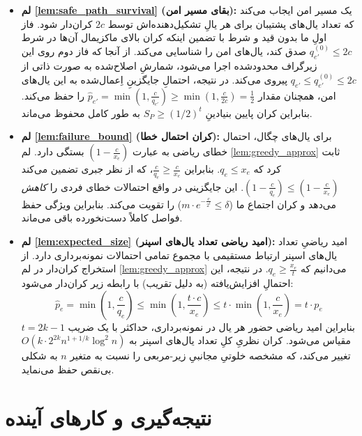 \documentclass[11pt,a4paper]{report}
\theoremstyle{plain}
\theoremstyle{definition}
\theoremstyle{remark}
\begin{document}
\begin{itemize}
    \item \textbf{لم \ref{lem:safe_path_survival} (بقای مسیر امن):} یک مسیر امن ایجاب می‌کند که تعداد یال‌های پشتیبان برای هر یالِ تشکیل‌دهنده‌اش توسط $2c$ کران‌دار شود. فاز اولِ ما بدون قید و شرط با تضمین اینکه کران بالای ماکزیمال آن‌ها در شرط $q_{e'}^{(0)} \le 2c$ صدق کند، یال‌های امن را شناسایی می‌کند. از آنجا که فاز دوم روی این زیرگراف محدودشده اجرا می‌شود، شمارشِ اصلاح‌شده به صورت ذاتی از $q_{e'} \le q_{e'}^{(0)} \le 2c$ پیروی می‌کند. در نتیجه، احتمالِ جایگزینِ اِعمال‌شده به این یال‌های امن، همچنان مقدار $\hat{p}_{e'} = \min\left(1, \frac{c}{q_{e'}}\right) \ge \min\left(1, \frac{c}{2c}\right) = \frac{1}{2}$ را حفظ می‌کند. بنابراین کران پایین بنیادینِ $S_P \ge (1/2)^t$ به طور کامل محفوظ می‌ماند.
    
    \item \textbf{لم \ref{lem:failure_bound} (کران احتمال خطا):} برای یال‌های چگال، احتمال خطای ریاضی به عبارت $(1 - \frac{c}{x_e})$ بستگی دارد. لم \ref{lem:greedy_approx} ثابت کرد که $q_e \le x_e$. بنابراین $\frac{c}{q_e} \ge \frac{c}{x_e}$، که از نظر جبری تضمین می‌کند $\left(1 - \frac{c}{q_e}\right) \le \left(1 - \frac{c}{x_e}\right)$. این جایگزینی در واقع احتمالات خطای فردی را \emph{کاهش} می‌دهد و کران اجتماع ما ($m \cdot e^{-\frac{c}{2^t}} \le \delta$) را تقویت می‌کند. بنابراین ویژگی حفظ فواصل کاملاً دست‌نخورده باقی می‌ماند.
    
    \item \textbf{لم \ref{lem:expected_size} (امید ریاضی تعداد یال‌های اسپنر):} امید ریاضیِ تعداد یال‌های اسپنر ارتباط مستقیمی با مجموع تمامی احتمالات نمونه‌برداری دارد. از استخراج کران‌دار در لم \ref{lem:greedy_approx} می‌دانیم که $q_e \ge \frac{x_e}{t}$. در نتیجه، این احتمالِ افزایش‌یافته (به دلیل تقریب) با رابطه زیر کران‌دار می‌شود:
    \[
    \hat{p}_e = \min\left(1, \frac{c}{q_e}\right) \le \min\left(1, \frac{t \cdot c}{x_e}\right) \le t \cdot \min\left(1, \frac{c}{x_e}\right) = t \cdot p_e
    \]
    بنابراین امید ریاضی حضور هر یال در نمونه‌برداری، حداکثر با یک ضریب $t = 2k-1$ مقیاس می‌شود. کران نظریِ کلِ تعداد یال‌های اسپنر به $O(k \cdot 2^{2k} n^{1+1/k} \log^2 n)$ تغییر می‌کند، که مشخصه خلوتیِ مجانبیِ زیر-مربعی را نسبت به متغیر $n$ به شکلی بی‌نقص حفظ می‌نماید.
\end{itemize}

\chapter*{نتیجه‌گیری و کارهای آینده}
\end{document}
